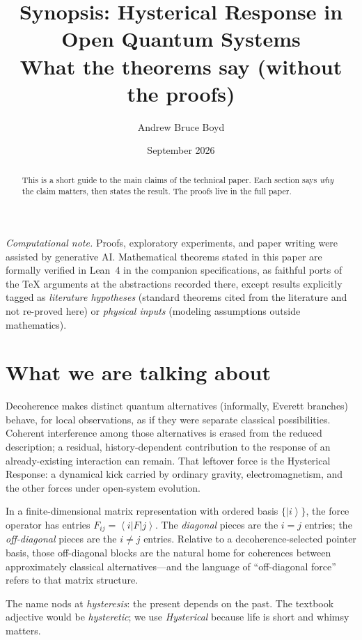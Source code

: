 \documentclass[11pt]{article}
\title{\textbf{Synopsis: Hysterical Response in Open Quantum Systems}\\[0.35em]
\large What the theorems say (without the proofs)}
\author{Andrew Bruce Boyd}
\date{September 2026}
\theoremstyle{remark}
\newcommand{\ket}[1]{\left|#1\right\rangle}
\newcommand{\bra}[1]{\left\langle#1\right|}
\begin{document}
\maketitle
\noindent\textit{Computational note.}
Proofs, exploratory experiments, and paper writing were assisted by generative AI.
Mathematical theorems stated in this paper are formally verified in Lean~4 in the
companion specifications, as faithful ports of the TeX arguments at the abstractions
recorded there, except results explicitly tagged as \emph{literature hypotheses}
(standard theorems cited from the literature and not re-proved here) or
\emph{physical inputs} (modeling assumptions outside mathematics).

\begin{abstract}
This is a short guide to the main claims of the technical paper.
Each section says \emph{why} the claim matters, then states the result.
The proofs live in the full paper.
\end{abstract}

\section{What we are talking about}
Decoherence makes distinct quantum alternatives (informally, Everett branches) behave, for local observations, as if they were separate classical possibilities.
Coherent interference among those alternatives is erased from the reduced description; a residual, history-dependent contribution to the response of an already-existing interaction can remain.
That leftover force is the Hysterical Response: a dynamical kick carried by ordinary gravity, electromagnetism, and the other forces under open-system evolution.

In a finite-dimensional matrix representation with ordered basis $\{\ket{i}\}$, the force operator has entries $F_{ij}=\bra{i}F\ket{j}$.
The \emph{diagonal} pieces are the $i=j$ entries; the \emph{off-diagonal} pieces are the $i\neq j$ entries.
Relative to a decoherence-selected pointer basis, those off-diagonal blocks are the natural home for coherences between approximately classical alternatives---and the language of ``off-diagonal force'' refers to that matrix structure.

The name nods at \emph{hysteresis}: the present depends on the past.
The textbook adjective would be \emph{hysteretic}; we use \emph{Hysterical} because life is short and whimsy matters.
\end{document}

